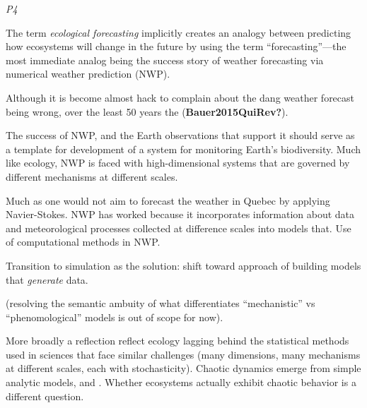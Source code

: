 \documentclass[10pt,oneside]{article}
\begin{document}
\emph{P4}

The term \emph{ecological forecasting} implicitly creates an analogy
between predicting how ecosystems will change in the future by using the
term ``forecasting''---the most immediate analog being the success story
of weather forecasting via numerical weather prediction (NWP).

Although it is become almost hack to complain about the dang weather
forecast being wrong, over the least 50 years the
(\textbf{Bauer2015QuiRev?}).

The success of NWP, and the Earth observations that support it should
serve as a template for development of a system for monitoring Earth's
biodiversity. Much like ecology, NWP is faced with high-dimensional
systems that are governed by different mechanisms at different scales.

Much as one would not aim to forecast the weather in Quebec by applying
Navier-Stokes. NWP has worked because it incorporates information about
data and meteorological processes collected at difference scales into
models that. Use of computational methods in NWP.

Transition to simulation as the solution: shift toward approach of
building models that \emph{generate} data.

(resolving the semantic ambuity of what differentiates ``mechanistic''
vs ``phenomological'' models is out of scope for now).

More broadly a reflection reflect ecology lagging behind the statistical
methods used in sciences that face similar challenges (many dimensions,
many mechanisms at different scales, each with stochasticity). Chaotic
dynamics emerge from simple analytic models, and . Whether ecosystems
actually exhibit chaotic behavior is a different question.
\end{document}
